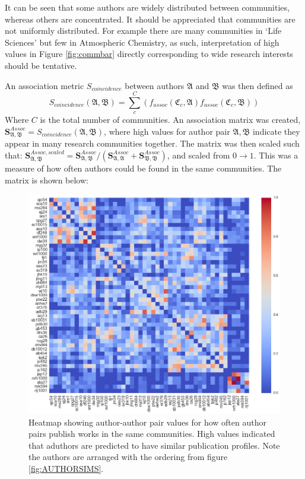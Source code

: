 It can be seen that some authors are widely distributed between communities, whereas others are concentrated.
It should be appreciated that communities are not uniformly distributed. For example there are many communities in `Life Sciences' but few in Atmospheric Chemistry, as such, interpretation of high values in Figure \ref{fig:commbar} directly corresponding to wide research interests should be tentative.

An association metric $S_{coincidence}$ between authors $\mathfrak{A}$ and $\mathfrak{B}$ was then defined as $$S_{coincidence}\left( \mathfrak{A} , \mathfrak{B} \right) = \sum_c^C \left(f_{assoc} \left( \mathfrak{C}_c , \mathfrak{A} \right) f_{assoc}\left( \mathfrak{C}_c , \mathfrak{B} \right) \right) $$
Where $C$ is the total number of communities. An association matrix was created, $\mathbf{S}^{Assoc}_{\mathfrak{A} , \mathfrak{B}} = S_{coincidence}\left( \mathfrak{A} , \mathfrak{B} \right)$, where high values for author pair $\mathfrak{A} , \mathfrak{B}$ indicate they appear in many research communities together. The matrix was then scaled such that: $\mathbf{S}^{Assoc,scaled}_{\mathfrak{A} , \mathfrak{B}} =  \mathbf{S}^{Assoc}_{\mathfrak{A} , \mathfrak{B}} /  \left( \mathbf{S}^{Assoc}_{\mathfrak{A} , \mathfrak{A}} + \mathbf{S}^{Assoc}_{\mathfrak{B} , \mathfrak{B}} \right) $, and scaled from $0 \rightarrow 1$. This was a measure of how often authors could be found in the same communities. The matrix is shown below:
\begin{center}
\begin{figure}[H]
  \centering
    \includegraphics[width=\textwidth]{Analysis/author_comm_heatmap.png}
    \caption{Heatmap showing author-author pair values for how often author pairs publish works in the same communities. High values indicated that aduthors are predicted to have similar publication profiles. Note the authors are arranged with the ordering from figure \ref{fig:AUTHORSIMS}.}
    \label{fig:commHEATMAP}

\end{figure} 
\end{center}

